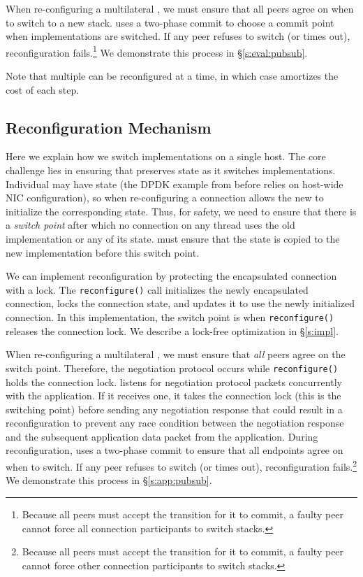 {\begin{outline}
\0 When re-configuring a multilateral \tunnel, we must ensure that all peers agree on when to switch to a new \tunnel stack. \name uses a two-phase commit to choose a commit point when \tunnel
implementations are switched. If any peer refuses to switch (or times out), reconfiguration fails.\footnote{Because all peers must accept the transition for it to commit, a faulty peer cannot force all connection participants to switch stacks.}
We demonstrate this process in \S\ref{s:eval:pubsub}.

  \1  Note that multiple \tunnels can be reconfigured at a time, in which case \name amortizes the cost of each step. 
\end{outline}
}

\subsection{Reconfiguration Mechanism}\label{s:impl-reconfig}
Here we explain how we switch implementations on a single host.
The core challenge lies in ensuring that \name preserves state as it switches \tunnel implementations. 
Individual \tunnels may have state (\eg the DPDK example from before relies on host-wide NIC configuration), so when re-configuring a connection \name allows the new \tunnel to initialize the corresponding state.
Thus, for safety, we need to ensure that there is a \emph{switch point} after which no connection on any thread uses the old implementation or any of its state.
\name must ensure that the state is copied to the new implementation before this switch point.

We can implement reconfiguration by protecting the encapsulated connection with a lock. The \texttt{reconfigure()} call initializes the newly encapsulated connection, locks the connection state, and updates it to use the newly initialized connection.
In this implementation, the switch point is when \texttt{reconfigure()} releases the connection lock.
We describe a lock-free optimization in  \S\ref{s:impl}.

When re-configuring a multilateral \tunnel, we must ensure that \emph{all} peers agree on the switch point. 
Therefore, the negotiation protocol occurs while \texttt{reconfigure()} holds the connection lock.
\name listens for negotiation protocol packets concurrently with the application. If it receives one, it takes the connection lock (this is the switching point) before sending any negotiation response that could result in a reconfiguration to prevent any race condition between the negotiation response and the subsequent application data packet from the application. 
During reconfiguration, \name uses a two-phase commit to ensure that all endpoints agree on when to switch.
If any peer refuses to switch (or times out), reconfiguration fails.\footnote{Because all peers must accept the transition for it to commit, a faulty peer cannot force other connection participants to switch \tunnel stacks.}
We demonstrate this process in \S\ref{s:app:pubsub}.


